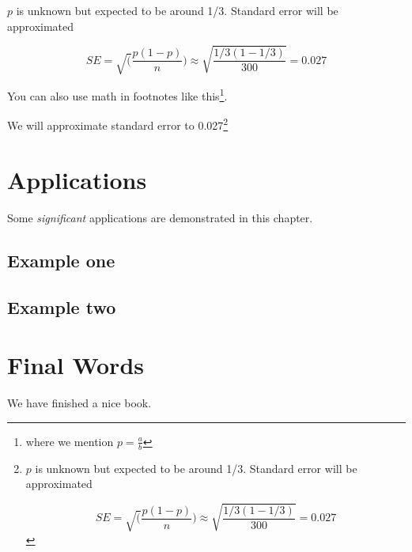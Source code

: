 \documentclass[
]{book}
\begin{document}
\(p\) is unknown but expected to be around 1/3. Standard error will be approximated

\[
SE = \sqrt(\frac{p(1-p)}{n}) \approx \sqrt{\frac{1/3 (1 - 1/3)} {300}} = 0.027
\]

You can also use math in footnotes like this\footnote{where we mention \(p = \frac{a}{b}\)}.

We will approximate standard error to 0.027\footnote{\(p\) is unknown but expected to be around 1/3. Standard error will be approximated

  \[
  SE = \sqrt(\frac{p(1-p)}{n}) \approx \sqrt{\frac{1/3 (1 - 1/3)} {300}} = 0.027
  \]}

\hypertarget{applications}{%
\chapter{Applications}\label{applications}}

Some \emph{significant} applications are demonstrated in this chapter.

\hypertarget{example-one}{%
\section{Example one}\label{example-one}}

\hypertarget{example-two}{%
\section{Example two}\label{example-two}}

\hypertarget{final-words}{%
\chapter{Final Words}\label{final-words}}

We have finished a nice book.

  
\end{document}
